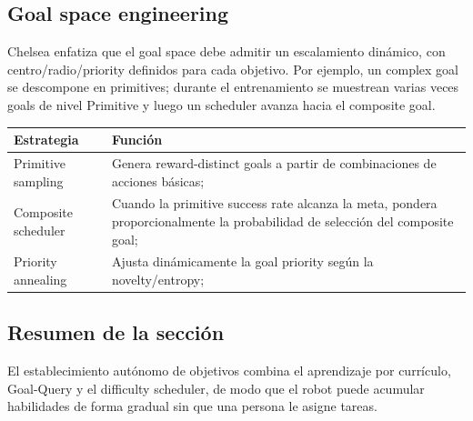 \subsection{Goal space engineering}
Chelsea enfatiza que el goal space debe admitir un escalamiento dinámico, con centro/radio/priority definidos para cada objetivo. Por ejemplo, un complex goal se descompone en primitives; durante el entrenamiento se muestrean varias veces goals de nivel Primitive y luego un scheduler avanza hacia el composite goal.

\begin{tabularx}{\textwidth}{lX}
\toprule
Estrategia & Función \\
\midrule
Primitive sampling & Genera reward-distinct goals a partir de combinaciones de acciones básicas; \\
Composite scheduler & Cuando la primitive success rate alcanza la meta, pondera proporcionalmente la probabilidad de selección del composite goal; \\
Priority annealing & Ajusta dinámicamente la goal priority según la novelty/entropy; \\
\bottomrule
\end{tabularx}

\subsection{Resumen de la sección}
El establecimiento autónomo de objetivos combina el aprendizaje por currículo, Goal-Query y el difficulty scheduler, de modo que el robot puede acumular habilidades de forma gradual sin que una persona le asigne tareas.
\newpage
